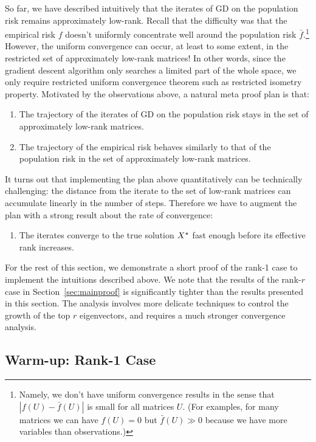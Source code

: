 So far, we have described intuitively that the iterates of GD on the population risk remains approximately low-rank. 
Recall that the difficulty was that the empirical risk $f$ doesn't uniformly concentrate well around the population risk $\bar{f}$.\footnote{Namely, we don't have uniform convergence results in the sense that $|f(U)-\bar{f}(U)|$ is small for all matrices $U$.  (For examples, for many matrices we can have $f(U) = 0$ but $\bar{f}(U) \gg 0$ because we have more variables than observations.)} However, the uniform convergence can occur, at least to some extent, in the restricted set of approximately low-rank matrices! In other words, since the gradient descent algorithm only searches a limited part of the whole space, we only require restricted uniform convergence theorem such as restricted isometry property. 
Motivated by the observations above, a natural meta proof plan is that:
\begin{enumerate}
	\item[1.] The trajectory of the iterates of GD on the population risk stays in the set of approximately low-rank matrices.
	\item[2.] The trajectory of the empirical risk behaves similarly to that of the population risk in the set of approximately low-rank matrices.
\end{enumerate}
It turns out that implementing the plan above quantitatively can be technically challenging: the distance from the iterate to the set of low-rank matrices can accumulate linearly in the number of steps. Therefore we have to augment the plan with a strong result about the rate of convergence: 
\begin{enumerate}
	\item[3.] The iterates converge to the true solution ${X}^\star$ fast enough before its effective rank increases.
\end{enumerate}
For the rest of this section, we demonstrate a short proof of the rank-1 case to implement the intuitions described above.
We note that the results of the rank-$r$ case in Section~\ref{sec:mainproof} is significantly tighter than the results presented in this section.
The analysis involves more delicate techniques to control the growth of the top $r$ eigenvectors, and requires a much stronger convergence analysis.


\subsection{Warm-up: Rank-1 Case}

